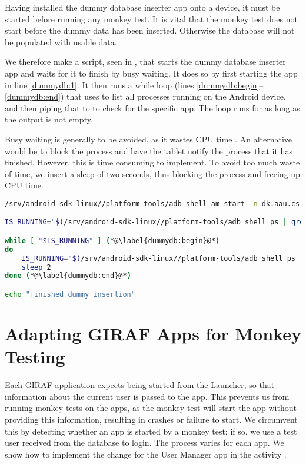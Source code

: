 Having installed the dummy database inserter app onto a device, it must be started before running any monkey test. It is vital that the monkey test does not start before the dummy data has been inserted. Otherwise the database will not be populated with usable data.

We therefore make a script, seen in , that starts the dummy database inserter app and waits for it to finish by busy waiting. It does so by first starting the app in line \ref{dummydb:1}. It then runs a while loop (lines \ref{dummydb:begin}--\ref{dummydb:end}) that uses  to list all processes running on the Android device, and then piping that to  to check for the specific app. The loop runs for as long as the output is not empty.

Busy waiting is generally to be avoided, as it wastes CPU time \parencite[ch.2]{tanenbaum2007}. An alternative would be to block the process and have the tablet notify the process that it has finished. However, this is time consuming to implement. To avoid too much waste of time, we insert a sleep of two seconds, thus blocking the process and freeing up CPU time.

\begin{lstlisting}[language=bash,showstringspaces=false,caption=Bash script which starts and waits for dummy database inserter,label=lst:start_wait_dummy_db_inserter]
/srv/android-sdk-linux//platform-tools/adb shell am start -n dk.aau.cs.giraf.dummydbinserter/dk.aau.cs.giraf.dummydbinserter.MainActivity (*@\label{dummydb:1}@*)

IS_RUNNING="$(/srv/android-sdk-linux//platform-tools/adb shell ps | grep dk.aau.cs.giraf.dummydbinserter)"

while [ "$IS_RUNNING" ] (*@\label{dummydb:begin}@*)
do
    IS_RUNNING="$(/srv/android-sdk-linux//platform-tools/adb shell ps | grep dk.aau.cs.giraf.dummydbinserter)"
    sleep 2
done (*@\label{dummydb:end}@*)

echo "finished dummy insertion"
\end{lstlisting}

\section{Adapting GIRAF Apps for Monkey Testing}\label{sec:adapting_apps_for_monkey_testing}
Each GIRAF application expects being started from the Launcher, so that information about the current user is passed to the app. This prevents us from running monkey tests on the apps, as the monkey test will start the app without providing this information, resulting in crashes or failure to start. We circumvent this by detecting whether an app is started by a monkey test; if so, we use a test user received from the database to login. The process varies for each app. We show how to implement the change for the User Manager app in the activity .


